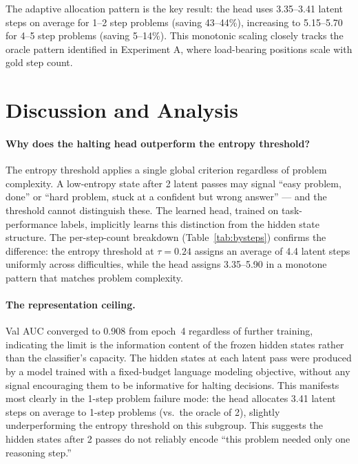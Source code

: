\documentclass{article}
\begin{document}
The adaptive allocation pattern is the key result: the head uses 3.35--3.41 latent steps on average for 1--2 step problems (saving 43--44\%), increasing to 5.15--5.70 for 4--5 step problems (saving 5--14\%). This monotonic scaling closely tracks the oracle pattern identified in Experiment A, where load-bearing positions scale with gold step count.


\section{Discussion and Analysis}

\paragraph{Why does the halting head outperform the entropy threshold?}

The entropy threshold applies a single global criterion regardless of problem complexity. A low-entropy state after 2 latent passes may signal ``easy problem, done'' or ``hard problem, stuck at a confident but wrong answer'' --- and the threshold cannot distinguish these. The learned head, trained on task-performance labels, implicitly learns this distinction from the hidden state structure. The per-step-count breakdown (Table~\ref{tab:bysteps}) confirms the difference: the entropy threshold at $\tau = 0.24$ assigns an average of 4.4 latent steps uniformly across difficulties, while the head assigns 3.35--5.90 in a monotone pattern that matches problem complexity.

\paragraph{The representation ceiling.}

Val AUC converged to 0.908 from epoch~4 regardless of further training, indicating the limit is the information content of the frozen hidden states rather than the classifier's capacity. The hidden states at each latent pass were produced by a model trained with a fixed-budget language modeling objective, without any signal encouraging them to be informative for halting decisions. This manifests most clearly in the 1-step problem failure mode: the head allocates 3.41 latent steps on average to 1-step problems (vs.\ the oracle of 2), slightly underperforming the entropy threshold on this subgroup. This suggests the hidden states after 2 passes do not reliably encode ``this problem needed only one reasoning step.''
\end{document}
